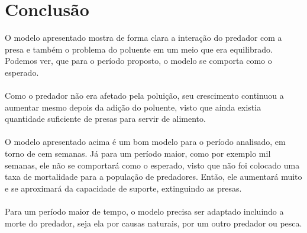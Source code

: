 \documentclass[a4paper]{article}
\begin{document}
\section{Conclus\~ao}
O modelo apresentado mostra de forma clara a intera\c{c}\~ao do predador com a presa e tamb\'em o problema do poluente em um meio que era equilibrado. Podemos ver, que para o per\'iodo proposto, o modelo se comporta como o esperado.
\\
\\
Como o predador n\~ao era afetado pela polui\c{c}\~ao, seu crescimento continuou a aumentar mesmo depois da adi\c{c}\~ao do poluente, visto que ainda existia quantidade suficiente de presas para servir de alimento.
\\
\\
O modelo apresentado acima \'e um bom modelo para o per\'iodo analisado, em torno de cem semanas. J\'a para um per\'iodo maior, como por exemplo mil semanas, ele n\~ao se comportar\'a como o esperado, visto que n\~ao foi colocado uma taxa de mortalidade para a popula\c{c}\~ao de predadores. Ent\~ao, ele aumentar\'a muito e se aproximar\'a da capacidade de suporte, extinguindo as presas.
\\
\\
Para um per\'iodo maior de tempo, o modelo precisa ser adaptado incluindo a morte do predador, seja ela por causas naturais, por um outro predador ou pesca.
\end{document}
